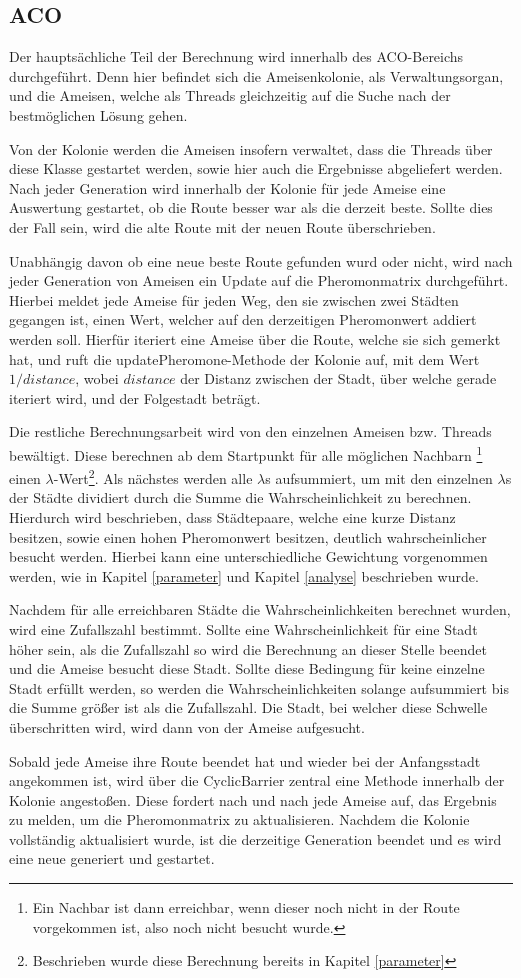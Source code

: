 \subsection{ACO}
Der hauptsächliche Teil der Berechnung wird innerhalb des \ac{ACO}-Bereichs durchgeführt. Denn hier befindet sich die Ameisenkolonie, als Verwaltungsorgan, und die Ameisen, welche als Threads gleichzeitig auf die Suche nach der bestmöglichen Lösung gehen.

Von der Kolonie werden die Ameisen insofern verwaltet, dass die Threads über diese Klasse gestartet werden, sowie hier auch die Ergebnisse abgeliefert werden. Nach jeder Generation wird innerhalb der Kolonie für jede Ameise eine Auswertung gestartet, ob die Route besser war als die derzeit beste. Sollte dies der Fall sein, wird die alte Route mit der neuen Route überschrieben.

Unabhängig davon ob eine neue beste Route gefunden wurd oder nicht, wird nach jeder Generation von Ameisen ein Update auf die Pheromonmatrix durchgeführt. Hierbei meldet jede Ameise für jeden Weg, den sie zwischen zwei Städten gegangen ist, einen Wert, welcher auf den derzeitigen Pheromonwert addiert werden soll. Hierfür iteriert eine Ameise über die Route, welche sie sich gemerkt hat, und ruft die updatePheromone-Methode der Kolonie auf, mit dem Wert $1/distance$, wobei $distance$ der Distanz zwischen der Stadt, über welche gerade iteriert wird, und der Folgestadt beträgt. 

Die restliche Berechnungsarbeit wird von den einzelnen Ameisen bzw. Threads bewältigt. Diese berechnen ab dem Startpunkt für alle möglichen Nachbarn
\footnote{Ein Nachbar ist dann erreichbar, wenn dieser noch nicht in der Route vorgekommen ist, also noch nicht besucht wurde.} einen $\lambda$-Wert\footnote{Beschrieben wurde diese Berechnung bereits in Kapitel \ref{parameter}}. 
Als nächstes werden alle $\lambda$s aufsummiert, um mit den einzelnen $\lambda$s der Städte dividiert durch die Summe die Wahrscheinlichkeit zu berechnen. Hierdurch wird beschrieben, dass Städtepaare, welche eine kurze Distanz besitzen, sowie einen hohen Pheromonwert besitzen, deutlich wahrscheinlicher besucht werden. Hierbei kann eine unterschiedliche Gewichtung vorgenommen werden, wie in Kapitel \ref{parameter} und Kapitel \ref{analyse} beschrieben wurde.

Nachdem für alle erreichbaren Städte die Wahrscheinlichkeiten berechnet wurden, wird eine Zufallszahl bestimmt. Sollte eine Wahrscheinlichkeit für eine Stadt höher sein, als die Zufallszahl so wird die Berechnung an dieser Stelle beendet und die Ameise besucht diese Stadt. Sollte diese Bedingung für keine einzelne Stadt erfüllt werden, so werden die Wahrscheinlichkeiten solange aufsummiert bis die Summe größer ist als die Zufallszahl. Die Stadt, bei welcher diese Schwelle überschritten wird, wird dann von der Ameise aufgesucht.

Sobald jede Ameise ihre Route beendet hat und wieder bei der Anfangsstadt angekommen ist, wird über die CyclicBarrier zentral eine Methode innerhalb der Kolonie angestoßen. Diese fordert nach und nach jede Ameise auf, das Ergebnis zu melden, um die Pheromonmatrix zu aktualisieren. Nachdem die Kolonie vollständig aktualisiert wurde, ist die derzeitige Generation beendet und es wird eine neue generiert und gestartet.